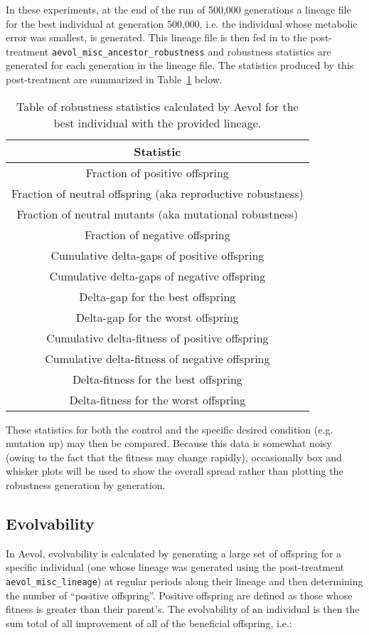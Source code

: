 In these experiments, at the end of the run of 500,000 generations a lineage file for the best individual at generation 500,000, i.e. the individual whose metabolic error was smallest, is generated. This lineage file is then fed in to the post-treatment \texttt{aevol\_misc\_ancestor\_robustness} and robustness statistics are generated for each generation in the lineage file. The statistics produced by this post-treatment are summarized in Table~\ref{table:robustness} below.
\begin{table}[H]
	\centering
	\begin{tabular}{||c||}
		\hline
		\textbf{Statistic} \\
		\hline \hline
		Fraction of positive offspring \\
		\hline
		Fraction of neutral offspring (aka reproductive robustness) \\
		\hline
		Fraction of neutral mutants (aka mutational robustness) \\
		\hline
		Fraction of negative offspring \\
		\hline
		Cumulative delta-gaps of positive offspring \\
		\hline
		Cumulative delta-gaps of negative offspring \\
		\hline
		Delta-gap for the best offspring \\
		\hline
		Delta-gap for the worst offspring \\
		\hline
		Cumulative delta-fitness of positive offspring \\
		\hline
		Cumulative delta-fitness of negative offspring \\
		\hline
		Delta-fitness for the best offspring \\
		\hline
		Delta-fitness for the worst offspring \\
		\hline
		
	\end{tabular}
	\caption[Aevol robustness statistics]{Table of robustness statistics calculated by Aevol for the best individual with the provided lineage.}
	\label{table:robustness}
\end{table}
These statistics for both the control and the specific desired condition (e.g. mutation up) may then be compared. Because this data is somewhat noisy (owing to the fact that the fitness may change rapidly), occasionally box and whisker plots will be used to show the overall spread rather than plotting the robustness generation by generation. 
\subsection{Evolvability}\label{aevol:evolvability}
In Aevol, evolvability is calculated by generating a large set of offspring for a specific individual (one whose lineage was generated using the post-treatment \texttt{aevol\_misc\_lineage}) at regular periods along their lineage and then determining the number of ``positive offspring''. Positive offspring are defined as those whose fitness is greater than their parent's. The evolvability of an individual is then the sum total of all improvement of all of the beneficial offspring, i.e.:

